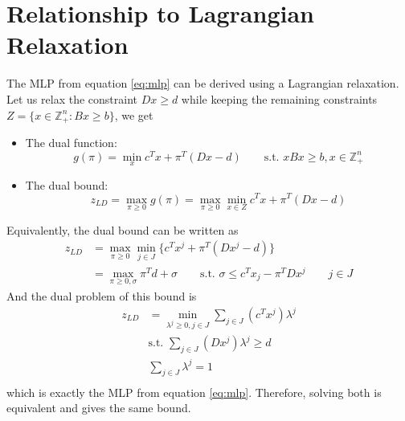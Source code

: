 \documentclass[12pt, openany]{report}
\newcommand{\Z}{\mathbb{Z}}
\theoremstyle{definition}
\begin{document}
\section{Relationship to Lagrangian Relaxation}
The MLP from equation \eqref{eq:mlp} can be derived using a Lagrangian relaxation. Let us relax the constraint $Dx\ge d$ while keeping the remaining constraints $Z=\{x\in \Z_+^n:Bx\ge b\}$, we get
\begin{itemize}
	\item The dual function:
	\begin{equation}
		g(\pi) = \min_x c^T x + \pi^T(Dx-d) \qquad \text{s.t. } xBx\ge b, x\in \Z_+^n
	\end{equation}
	\item The dual bound:
	\begin{equation}
		z_{LD} = \max_{\pi\ge 0} g(\pi) = \max_{\pi\ge 0} \min_{x\in Z} c^T x + \pi^T(Dx-d)
	\end{equation}
\end{itemize}
Equivalently, the dual bound can be written as
\begin{equation}
	\begin{aligned}
		z_{LD} &= \max_{\pi\ge 0}\min_{j\in J}\{c^T x^j + \pi^T(Dx^j-d)\}\\
		&= \max_{\pi\ge 0, \sigma} \pi^Td+\sigma \qquad \text{s.t. } \sigma \le c^T x_j - \pi^T Dx^j\qquad j\in J
	\end{aligned}
\end{equation}
And the dual problem of this bound is 
\begin{equation}
	\begin{aligned}
		z_{LD} &= \min_{\lambda^j\ge 0, j\in J} \sum_{j\in J}(c^Tx^j)\lambda^j\\
		&\text{s.t. } \sum_{j\in J}(Dx^j)\lambda^j \ge d\\
		& \sum_{j\in J}\lambda^j = 1\\ 
	\end{aligned}
\end{equation}
which is exactly the MLP from equation \eqref{eq:mlp}. Therefore, solving both is equivalent and gives the same bound. 
\end{document}
